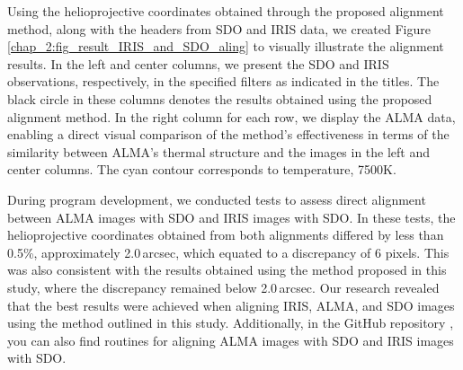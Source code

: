 \documentclass[a4paper,alpha-refs]{eSpectra}
\begin{document}



Using the helioprojective coordinates obtained through the proposed alignment method, along with the headers from SDO and IRIS data, we created Figure \ref{chap_2:fig_result_IRIS_and_SDO_aling} to visually illustrate the alignment results. In the left and center columns, we present the SDO and IRIS observations, respectively, in the specified filters as indicated in the titles.  The black circle in these columns denotes the results obtained using the proposed alignment method. In the right column for each row, we display the ALMA data,  enabling a direct visual comparison of the method's effectiveness in terms of the similarity between ALMA's thermal structure and the images in the left and center columns. The cyan contour corresponds to temperature, 7500K.


During program development, we conducted tests to assess direct alignment between ALMA images with SDO and IRIS images with SDO. In these tests,   the helioprojective coordinates obtained from both alignments differed by less than 0.5\%, approximately 2.0\,arcsec, which equated to a discrepancy of 6 pixels. This was also consistent with the results obtained using the method proposed in this study, where the discrepancy remained below 2.0\,arcsec. Our research revealed that the best results were achieved when aligning IRIS, ALMA, and SDO images using the method outlined in this study. Additionally, in the GitHub repository \cite{gibhub_reporsitory_alignment}, you can also find routines for aligning ALMA images with SDO and IRIS images with SDO.

 
\end{document}
